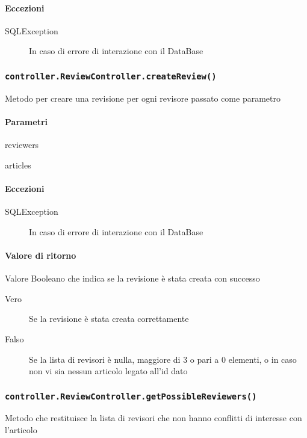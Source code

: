 \paragraph{Eccezioni}
\begin{description}
\item[SQLException] In caso di errore di interazione con il DataBase
\end{description}


\subsubsection{\texttt{controller.ReviewController.createReview()}}
 Metodo per creare una revisione per ogni revisore passato come parametro 
\paragraph{Parametri}
\begin{description}
\item reviewers
\item articles
\end{description}
\paragraph{Eccezioni}
\begin{description}
\item[SQLException] In caso di errore di interazione con il DataBase
\end{description}
\paragraph{Valore di ritorno}
Valore Booleano che indica se la revisione è stata creata con successo
\begin{description}
\item[Vero] Se la revisione è stata creata correttamente
\item[Falso] Se la lista di revisori è nulla, maggiore di 3 o pari a 0 elementi, o in caso non vi sia nessun articolo legato all'id dato
\end{description}



\subsubsection{\texttt{controller.ReviewController.getPossibleReviewers()}}
Metodo che restituisce la lista di revisori che non hanno conflitti di interesse con l'articolo
